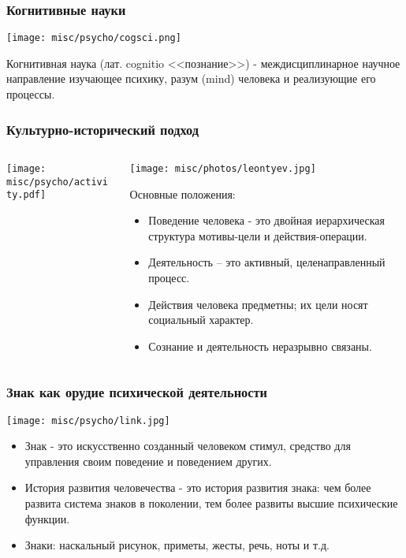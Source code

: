 \documentclass[default]{beamer}
\begin{document}
	
	\begin{frame}
		\frametitle{Когнитивные науки}
		
		
		\centering
		\texttt{[image: misc/psycho/cogsci.png]}
		
		Когнитивная наука (лат. cognitio <<познание>>) - междисциплинарное научное направление изучающее психику, разум (mind) человека и реализующие его процессы.
	\end{frame}	

	\begin{frame}
		\frametitle{Культурно-исторический подход}
		\small
		\begin{columns}
			\begin{column}{0.4\textwidth}
				\texttt{[image: misc/psycho/activity.pdf]}			
			\end{column}
			\begin{column}{0.6\textwidth}
				\begin{center}
					\texttt{[image: misc/photos/leontyev.jpg]}
				\end{center}
				Основные положения:
				\begin{itemize}
					\item Поведение человека - это двойная иерархическая структура мотивы-цели и действия-операции.
					\item Деятельность – это активный, целенаправленный процесс.
					\item Действия человека предметны; их цели носят социальный характер.
					\item Сознание и деятельность неразрывно связаны.
				\end{itemize}
			\end{column}
		\end{columns}
	\end{frame}

	\begin{frame}
		\frametitle{Знак как орудие психической деятельности}
		\begin{center}
			\texttt{[image: misc/psycho/link.jpg]}
		\end{center}
		
		\begin{itemize}
			\item Знак - это искусственно созданный человеком стимул, средство для управления своим поведение и поведением других.
			\item История развития человечества - это история развития знака: чем более развита система знаков в поколении, тем более развиты высшие психические функции.
			\item Знаки: наскальный рисунок, приметы, жесты, речь, ноты и т.д.
		\end{itemize}
	\end{frame}
\end{document}
